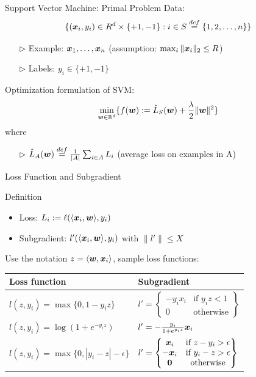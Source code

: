 \begin{frame}{Support Vector Machine: Primal Problem}
    Data: 
    \[
        \{(\bm{x}_i,y_i)\in R^d \times \{+1, -1\}: i\in S \overset{def}{=} \{1,2,\ldots,n\}\}
    \]
    \begin{itemize}
        \item[$\rhd$] Example: $\bm{x}_1,\ldots,\bm{x}_n$ (assumption: $\max_i\|\bm{x}_i\|_2\le R$)
        \item[$\rhd$] Labels: $y_i \in\{+1,-1\}$
    \end{itemize}
    {\color{red} Optimization formulation of SVM:}
    \[
        \min_{\bm{w}\in\mathbb{R}^d} \{ f(\bm{w}):= \hat{L}_S(\bm{w})+\frac {\lambda} {2} \|\bm{w}\|^2 \}
    \]
    where 
    \begin{itemize}
        \item[$\rhd$] $\hat{L}_A(\bm{w}) \overset{def}{=} \frac{1}{|A|} \sum_{i\in A} L_i$ (average loss on examples in A)
    \end{itemize}
\end{frame}

\begin{frame}{Loss Function and Subgradient}
    \begin{block}{Definition}
        \begin{itemize}
            \item Loss: $L_i := \ell(\langle \bm{x}_i, \bm{w} \rangle, y_i)$

            \item Subgradient: $l'(\langle \bm{x}_i, \bm{w} \rangle, y_i)$ with $\|l'\| \le X$
        \end{itemize}
    \end{block}
    Use the notation $z=\langle \bm{w}, \bm{x}_i\rangle$, sample loss functions:
    \begin{table}[h]
        \begin{tabular}{|l|l|}
            \hline
            Loss function & Subgradient  \\ \hline
            $l(z,y_i) = \max\{0,1-y_i z\}$ & $l' = \left\{
            \begin{matrix} -y_i x_i & \text{if } y_i z<1 \\ 
            0 & \text{otherwise}
            \end{matrix}
        \right\}$ \\ \hline
        $l(z,y_i) = \log(1+e^{-y_iz})$ & $l' = -\frac{y_i}{1+e^{y_i z}}\bm{x}_i$\\ \hline
        $l(z,y_i) = \max\{0, | y_i - z| - \epsilon\}$ & $l'=\left\{ 
        \begin{matrix}
            \bm{x}_i & \text{if } z-y_i > \epsilon \\
            -\bm{x}_i & \text{if } y_i-z > \epsilon \\
            \bm{0} & \text{otherwise}
        \end{matrix}
        \right\}$ \\ \hline
        \end{tabular}
    \end{table}
\end{frame}


